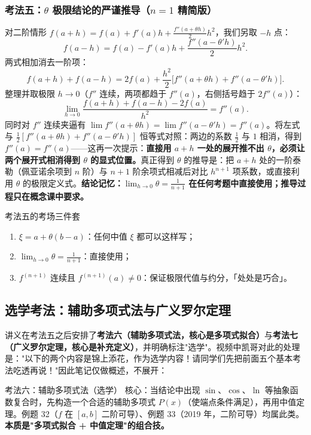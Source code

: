 \documentclass[a4paper]{article}
\begin{document}
\subsubsection{考法五：$\theta$ 极限结论的严谨推导（$n=1$ 精简版）}

对二阶情形 $f(a+h)=f(a)+f'(a)h+\frac{f''(a+\theta h)}{2}h^2$，我们另取 $-h$ 点：
\[
f(a-h)=f(a)-f'(a)h+\frac{f''(a-\theta'h)}{2}h^2 .
\]
两式相加消去一阶项：
\[
f(a+h)+f(a-h)=2f(a)+\frac{h^2}{2}\big[f''(a+\theta h)+f''(a-\theta'h)\big].
\]
整理并取极限 $h\to0$（$f''$ 连续，两项都趋于 $f''(a)$，右侧括号趋于 $2f''(a)$）：
\[
\lim_{h\to0}\frac{f(a+h)+f(a-h)-2f(a)}{h^2}=f''(a).
\]
同时对 $f''$ 连续夹逼有 $\lim f''(a+\theta h)=\lim f''(a-\theta'h)=f''(a)$。将左式与 $\frac{1}{2}[f''(a+\theta h)+f''(a-\theta'h)]$ 恒等式对照：两边的系数 $\frac12$ 与 $1$ 相消，得到 $f''(a)=f''(a)$——这再一次提示：\textbf{直接用 $a+h$ 一处的展开推不出 $\theta$，必须让两个展开式相消得到 $\theta$ 的显式位置。}真正得到 $\theta$ 的推导是：把 $a+h$ 处的一阶泰勒（佩亚诺余项到 $n$ 阶）与 $n+1$ 阶余项式相减后对比 $h^{n+1}$ 项系数，或直接利用 $\theta$ 的极限定义式。\textbf{结论记忆：$\lim_{h\to0}\theta=\frac1{n+1}$ 在任何考题中直接使用；推导过程只在概念课中要求。}

\begin{importantbox}{考法五的考场三件套}
\begin{enumerate}
\item $\xi=a+\theta(b-a)$：任何中值 $\xi$ 都可以这样写；
\item $\lim_{h\to0}\theta=\frac{1}{n+1}$：直接使用；
\item $f^{(n+1)}$ 连续且 $f^{(n+1)}(a)\neq0$：保证极限代值与约分，「处处是巧合」。
\end{enumerate}
\end{importantbox}

\subsection{选学考法：辅助多项式法与广义罗尔定理}

讲义在考法五之后安排了\textbf{考法六（辅助多项式法，核心是多项式拟合）}与\textbf{考法七（广义罗尔定理，核心是补充定义）}，并明确标注"选学"。视频中凯哥对此的处理是："以下的两个内容是锦上添花，作为选学内容！请同学们先把前面五个基本考法吃透再说！"因此笔记仅做概述，不展开：

\begin{knowledgebox}{考法六：辅助多项式法（选学）}
核心：当结论中出现 $\sin$、$\cos$、$\ln$ 等抽象函数复合时，先构造一个合适的辅助多项式 $P(x)$（使端点条件满足），再用中值定理。例题 32（$f$ 在 $[a,b]$ 二阶可导）、例题 33（2019 年，二阶可导）均属此类。\textbf{本质是"多项式拟合 + 中值定理"的组合技。}
\end{knowledgebox}
\end{document}
